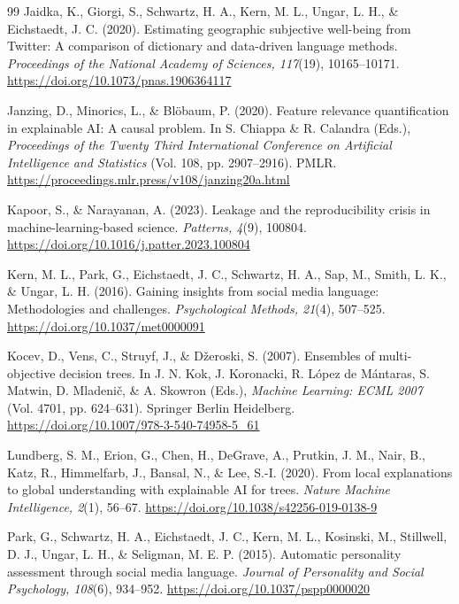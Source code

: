 \begin{thebibliography}{99}
Jaidka, K., Giorgi, S., Schwartz, H. A., Kern, M. L., Ungar, L. H., \& Eichstaedt, J. C. (2020). Estimating geographic subjective well-being from Twitter: A comparison of dictionary and data-driven language methods. \emph{Proceedings of the National Academy of Sciences, 117}(19), 10165--10171. \url{https://doi.org/10.1073/pnas.1906364117}

Janzing, D., Minorics, L., \& Blöbaum, P. (2020). Feature relevance quantification in explainable AI: A causal problem. In S. Chiappa \& R. Calandra (Eds.), \emph{Proceedings of the Twenty Third International Conference on Artificial Intelligence and Statistics} (Vol. 108, pp. 2907--2916). PMLR. \url{https://proceedings.mlr.press/v108/janzing20a.html}

Kapoor, S., \& Narayanan, A. (2023). Leakage and the reproducibility crisis in machine-learning-based science. \emph{Patterns, 4}(9), 100804. \url{https://doi.org/10.1016/j.patter.2023.100804}

Kern, M. L., Park, G., Eichstaedt, J. C., Schwartz, H. A., Sap, M., Smith, L. K., \& Ungar, L. H. (2016). Gaining insights from social media language: Methodologies and challenges. \emph{Psychological Methods, 21}(4), 507--525. \url{https://doi.org/10.1037/met0000091}

Kocev, D., Vens, C., Struyf, J., \& Džeroski, S. (2007). Ensembles of multi-objective decision trees. In J. N. Kok, J. Koronacki, R. López de Mántaras, S. Matwin, D. Mladenič, \& A. Skowron (Eds.), \emph{Machine Learning: ECML 2007} (Vol. 4701, pp. 624--631). Springer Berlin Heidelberg. \url{https://doi.org/10.1007/978-3-540-74958-5_61}

Lundberg, S. M., Erion, G., Chen, H., DeGrave, A., Prutkin, J. M., Nair, B., Katz, R., Himmelfarb, J., Bansal, N., \& Lee, S.-I. (2020). From local explanations to global understanding with explainable AI for trees. \emph{Nature Machine Intelligence, 2}(1), 56--67. \url{https://doi.org/10.1038/s42256-019-0138-9}

Park, G., Schwartz, H. A., Eichstaedt, J. C., Kern, M. L., Kosinski, M., Stillwell, D. J., Ungar, L. H., \& Seligman, M. E. P. (2015). Automatic personality assessment through social media language. \emph{Journal of Personality and Social Psychology, 108}(6), 934--952. \url{https://doi.org/10.1037/pspp0000020}


\end{thebibliography}
